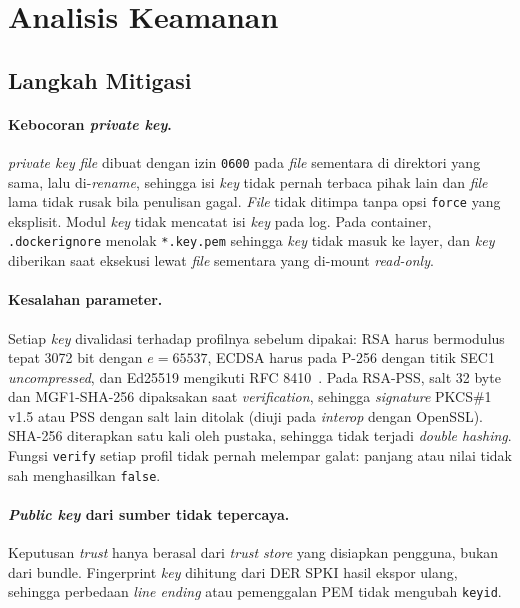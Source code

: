 \section{Analisis Keamanan}

\subsection{Langkah Mitigasi}

\paragraph{Kebocoran \textit{private key}.}
\textit{private key} \textit{file} dibuat dengan izin \texttt{0600} pada \textit{file} sementara di direktori
yang sama, lalu di-\textit{rename}, sehingga isi \textit{key} tidak pernah terbaca pihak lain dan
\textit{file} lama tidak rusak bila penulisan gagal. \textit{File} tidak ditimpa tanpa opsi
\texttt{force} yang eksplisit. Modul \textit{key} tidak mencatat isi \textit{key} pada log. Pada
container, \texttt{.dockerignore} menolak \texttt{*.key.pem} sehingga \textit{key} tidak masuk
ke layer, dan \textit{key} diberikan saat eksekusi lewat \textit{file} sementara yang di-mount
\textit{read-only}.

\paragraph{Kesalahan parameter.}
Setiap \textit{key} divalidasi terhadap profilnya sebelum dipakai: RSA harus bermodulus tepat
3072 bit dengan $e = 65537$, ECDSA harus pada P-256 dengan titik SEC1 \textit{uncompressed},
dan Ed25519 mengikuti RFC 8410~\cite{rfc8410}. Pada RSA-PSS, salt 32 byte dan MGF1-SHA-256 dipaksakan
saat \textit{verification}, sehingga \textit{signature} PKCS\#1 v1.5 atau PSS dengan salt lain ditolak
(diuji pada \textit{interop} dengan OpenSSL). SHA-256 diterapkan satu kali oleh pustaka,
sehingga tidak terjadi \textit{double hashing}. Fungsi \texttt{verify} setiap profil tidak
pernah melempar galat: panjang atau nilai tidak sah menghasilkan \texttt{false}.

\paragraph{\textit{Public key} dari sumber tidak tepercaya.}
Keputusan \textit{trust} hanya berasal dari \textit{trust store} yang disiapkan pengguna,
bukan dari bundle. Fingerprint \textit{key} dihitung dari DER SPKI hasil ekspor ulang, sehingga
perbedaan \textit{line ending} atau pemenggalan PEM tidak mengubah \texttt{keyid}.

